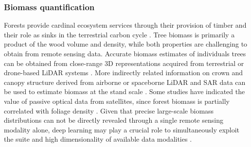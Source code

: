 \documentclass{CUP-JNL-DTM}%
\theoremstyle{definition}
\numberwithin{equation}{section}
\begin{document}
    
\subsubsection{Biomass quantification} 
\label{sec:topic_biomass}
Forests provide cardinal ecosystem services through their provision of timber and their role as sinks in the terrestrial carbon cycle \citep{regnier_land--ocean_2022}. Tree biomass is primarily a product of the wood volume and density, while both properties are challenging to obtain from remote sensing data. Accurate biomass estimates of individuals trees can be obtained from close-range 3D representations acquired from terrestrial or drone-based LiDAR systems \citep{brede_non-destructive_2022}. More indirectly related information on crown and canopy structure derived from airborne or spaceborne LiDAR and SAR data can be used to estimate biomass at the stand scale \citep{le_toan_biomass_2011, lu_survey_2016}. Some studies have indicated the value of passive optical data from satellites, since forest biomass is partially correlated with foliage density \citep{besnard_mapping_2021, potapov_mapping_2021}. Given that precise large-scale biomass distributions can not be directly revealed through a single remote sensing modality alone, deep learning may play a crucial role to simultaneously exploit the suite and high dimensionality of available data modalities \citep{yang_new_2020}.
\end{document}
